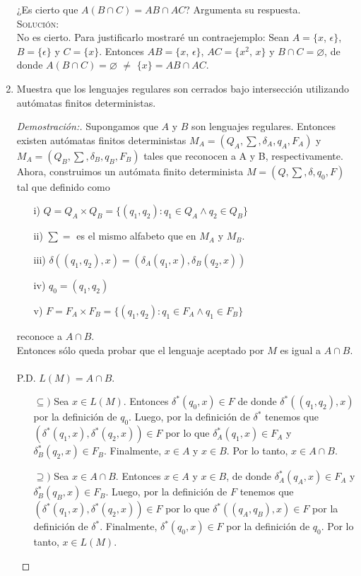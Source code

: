 \documentclass[letterpaper,11pt]{article}
\begin{document}
\begin{enumerate}
  ¿Es cierto que $A(B \cap C) = AB \cap AC$? Argumenta su respuesta.
  \textsc{\\Solución:\\} No es cierto. Para justificarlo mostraré un
  contraejemplo:
  Sean $A=\{x$, $\epsilon\}$, $B=\{\epsilon\}$ y $C=\{x\}$. Entonces 
  $AB = \{x$, $\epsilon\}$, $AC = \{x^{2}$, $x\}$ y $B \cap C = \varnothing$, 
  de donde $A(B \cap C) = \varnothing$ $\neq$ $\{x\} = AB \cap AC$.
  
\item Muestra que los lenguajes regulares son cerrados bajo intersección
  utilizando autómatas finitos deterministas.
  \begin{proof}[Demostración:] 
  Supongamos que $A$ y $B$ son lenguajes regulares. Entonces existen
  autómatas finitos deterministas $M_A = (Q_A, \sum , \delta_A, q_A, F_A)$
  y $M_A = (Q_B, \sum , \delta_B, q_B, F_B)$ tales que reconocen a A y B, 
  respectivamente. Ahora, construimos un autómata finito determinista
  $M = (Q, \sum , \delta, q_0, F)$ tal que definido como
  \begin{itemize}
   \item[i)] $Q = Q_A \times Q_B = \{(q_1, q_2) : q_1 \in Q_A \wedge q_2 \in 
                        Q_B\}$
   \item[ii)] $\sum =$ es el mismo alfabeto que en $M_A$ y $M_B$.
   \item[iii)] $\delta ((q_1, q_2), x) = (\delta_A(q_1, x), \delta_B(q_2, x))$
   \item[iv)] $q_0 = (q_1, q_2)$
   \item[v)] $F = F_A \times F_B =\{(q_1, q_2) : q_1 \in F_A \wedge q_1 \in 
                          F_B\}$      
  \end{itemize}
  reconoce a $A \cap B$.\\
  Entonces sólo queda probar que el lenguaje aceptado por $M$ es igual a 
  $A \cap B$.\\ \\
  P.D. $L(M) = A \cap B$.
  \begin{itemize}
   \item[$\subseteq )$] Sea $x \in L(M)$.  Entonces $\delta^{*} (q_0, x) \in F$
   de donde $\delta^{*} ((q_1, q_2), x)$ por la definición de $q_0$. Luego, 
   por la definición de $\delta^{*}$ tenemos que $( \delta^{*} (q_1, x), 
   \delta^{*} (q_2, x)) \in F$ por lo que $\delta_A^{*} (q_1, x) \in F_A$ y 
   $\delta_B^{*} (q_2, x) \in F_B$. Finalmente, $x \in A$ y $x \in B$. Por 
   lo tanto, $x \in A \cap B$.
   \item[$\supseteq )$] Sea $x \in A \cap B$. Entonces $x \in A$ y $x \in B$, de
   donde $\delta_A^{*} (q_A, x) \in F_A$ y $\delta_B^{*} (q_B, x) \in F_B$.
   Luego, por la definición de $F$ tenemos que  $( \delta^{*} (q_1, x), 
   \delta^{*} (q_2, x)) \in F$ por lo que $\delta^{*} ((q_A, q_B), x) \in F$
   por la definición de $\delta^{*}$. Finalmente, $\delta^{*} (q_0, x) \in F$
   por la definición de $q_0$. Por lo tanto, $x \in L(M)$.
  \end{itemize}
  \end{proof}


\end{enumerate}
\end{document}
